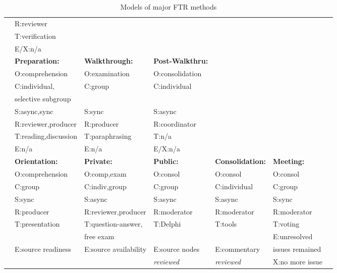 \begin{table}[tb]
\begin{center}
\begin{tabular}{|l|l|l|l|l|l|l|}
            & R:reviewer        &  & & & \\
            & T:verification    &  & & & \\
            & E/X:n/a             &  & & & \\
\hline
[Yourdon,89] & {\bf Preparation:} & {\bf Walkthrough:} & {\bf Post-Walkthru:} & & \\
             & O:comprehension  & O:examination     & O:consolidation  & & \\
             & C:individual,     & C:group           & C:individual & & \\
             & selective subgroup &                 &                & & \\
             & S:async,sync      & S:sync           & S:async      & & \\
             & R:reviewer,producer  & R:producer    & R:coordinator & & \\
             & T:reading,discussion & T:paraphrasing & T:n/a          &  & \\
             & E:n/a                 & E:n/a           & E/X:n/a & & \\
\hline
[Johnson,94] & {\bf Orientation:} & {\bf Private:}  & {\bf Public:} & {\bf Consolidation:} & {\bf Meeting:}\\
             & O:comprehension  & O:comp,exam       & O:consol          & O:consol   &  O:consol  \\
             & C:group          & C:indiv,group     & C:group           & C:individual & C:group \\
             & S:sync           & S:async           & S:async           & S:async     & S:sync \\
             & R:producer       & R:reviewer,producer & R:moderator     & R:moderator & R:moderator \\
             & T:presentation  & T:question-answer,  &  T:Delphi         & T:tools     & T:voting \\
             &                  & free exam          &                   &             &  E:unresolved \\
           & E:source readiness & E:source availability & E:source nodes & E:commentary & issues remained\\
             &               &                         & {\it reviewed} & {\it reviewed}& X:no more issue\\
\hline
\end{tabular}
 \end{center}
 \caption{Models of major FTR methods}
 \label{tab:framework-samples}
\end{table}




